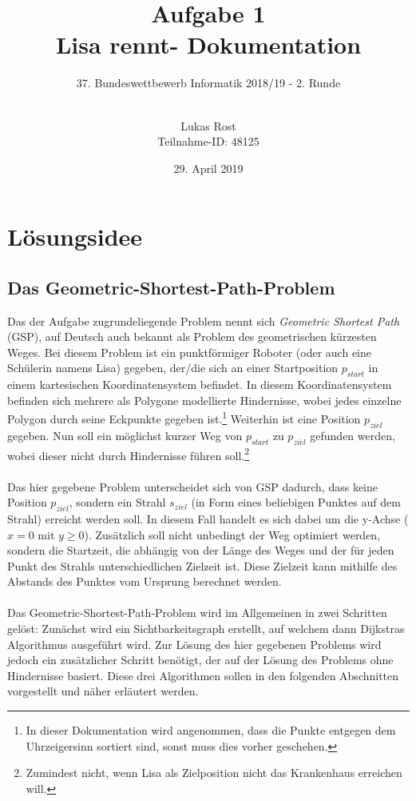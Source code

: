 \documentclass[a4paper, notitlepage, 12pt]{scrartcl}
\author{Lukas Rost \\ \small{Teilnahme-ID: 48125}}
\title{Aufgabe 1 \\ \glqq Lisa rennt\grqq  - Dokumentation}
\subtitle{37. Bundeswettbewerb Informatik 2018/19 - 2. Runde \\~\\}
\date{29. April 2019}
\begin{document}
\renewcommand{\contentsname}{\centerline{Inhaltsverzeichnis}}
 \maketitle
 \tableofcontents
 \thispagestyle{empty}
 \newpage
 \setcounter{page}{1}
 
 \section{Lösungsidee}
 \subsection{Das Geometric-Shortest-Path-Problem}
 Das der Aufgabe zugrundeliegende Problem nennt sich \textit{Geometric Shortest Path} (GSP), auf Deutsch auch bekannt als Problem des geometrischen kürzesten Weges. Bei diesem Problem ist ein punktförmiger Roboter (oder auch eine Schülerin namens Lisa) gegeben, der/die sich an einer Startposition $p_{start}$ in einem kartesischen Koordinatensystem befindet. In diesem Koordinatensystem befinden sich mehrere als Polygone modellierte Hindernisse, wobei jedes einzelne Polygon durch seine Eckpunkte gegeben ist.\footnote{In dieser Dokumentation wird angenommen, dass die Punkte entgegen dem Uhrzeigersinn sortiert sind, sonst muss dies vorher geschehen.} Weiterhin ist eine Position $p_{ziel}$ gegeben. Nun soll ein möglichst kurzer Weg von $p_{start}$ zu $p_{ziel}$ gefunden werden, wobei dieser nicht durch Hindernisse führen soll.\footnote{Zumindest nicht, wenn Lisa als Zielposition nicht das Krankenhaus erreichen will.}\cite{Src:noem} \\ \\
 Das hier gegebene Problem unterscheidet sich von GSP dadurch, dass keine Position $p_{ziel}$, sondern ein Strahl $s_{ziel}$ (in Form eines beliebigen Punktes auf dem Strahl) erreicht werden soll. In diesem Fall handelt es sich dabei um die y-Achse ($x=0$ mit $y \geq 0$). Zusätzlich soll nicht unbedingt der Weg optimiert werden, sondern die Startzeit, die abhängig von der Länge des Weges und der für jeden Punkt des Strahls unterschiedlichen Zielzeit ist. Diese Zielzeit kann mithilfe des Abstands des Punktes vom Ursprung berechnet werden. \\ \\
 Das Geometric-Shortest-Path-Problem wird im Allgemeinen in zwei Schritten gelöst: Zunächst wird ein Sichtbarkeitsgraph erstellt, auf welchem dann Dijkstras Algorithmus ausgeführt wird. Zur Lösung des hier gegebenen Problems wird jedoch ein zusätzlicher Schritt benötigt, der auf der Lösung des Problems ohne Hindernisse basiert. Diese drei Algorithmen sollen in den folgenden Abschnitten vorgestellt und näher erläutert werden.
\end{document}
